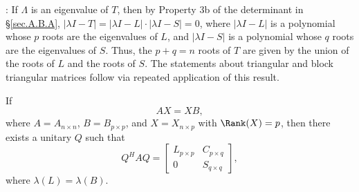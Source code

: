 \/: If $\Lambda$ is an eigenvalue of $T$, then by
Property 3b of the determinant in \S \ref{sec.A.B.A}, $|\lambda I-T|=|\lambda I-L|\cdot |\lambda I-S|=0$, where
$|\lambda I-L|$ is a polynomial whose $p$ roots are the eigenvalues of $L$, and
$|\lambda I-S|$ is a polynomial whose $q$ roots are the eigenvalues of $S$.  Thus, the
$p+q=n$ roots of $T$ are given by the union of the roots of $L$ and
the roots of $S$. The statements about triangular and block triangular matrices follow via repeated application of this result.\endproof

\begin{fact} \label{fact.A.D.C.B}
If
\begin{equation}
    AX=XB,
    \label{AX=XB}
\end{equation}
where $A=A_{n\times n}$, $B=B_{p\times p}$, and $X=X_{n\times p}$ with
$\Rank(X)=p$, then there exists a unitary $Q$ such that
\begin{equation}
Q^{H} A Q =\begin{bmatrix} L_{p\times p} & C_{p\times q} \\ 0 & S_{q
\times q} \end{bmatrix},
\label{QHAQ=L0CS}
\end{equation}
where $\lambda(L)=\lambda(B)$.
\end{fact}

